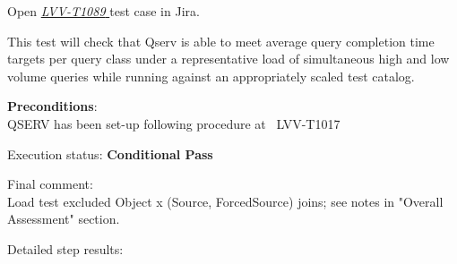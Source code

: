 \documentclass[DM,STR,toc]{lsstdoc}
\begin{document}
Open  \href{https://jira.lsstcorp.org/secure/Tests.jspa#/testCase/LVV-T1089}{\textit{ LVV-T1089 } }
test case in Jira.

    This test will check that Qserv is able to meet average query completion
time targets per query class under a representative load of simultaneous
high and low volume queries while running against an appropriately
scaled test catalog.


    \textbf{ Preconditions}:\\
    QSERV has been set-up following procedure at ~LVV-T1017


    Execution status: {\bf Conditional Pass }

    Final comment:\\Load test excluded Object x (Source, ForcedSource) joins; see notes in
"Overall Assessment" section.



    Detailed step results:
\end{document}
